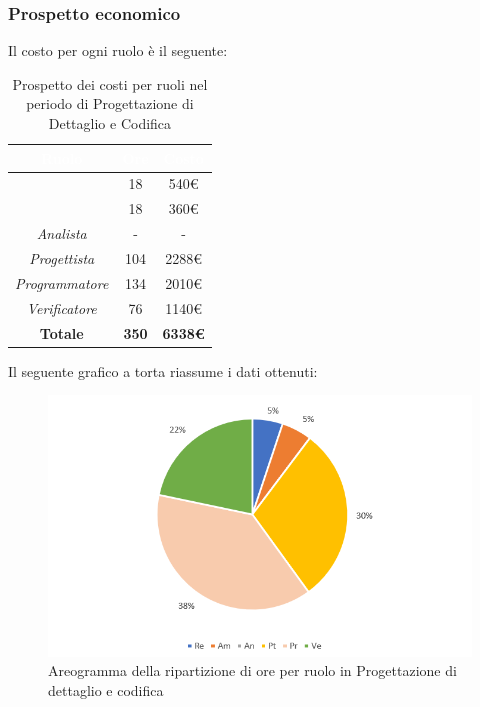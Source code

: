 \subsubsection{Prospetto economico}
Il costo per ogni ruolo è il seguente:
\begin{table}[H]
	\begin{center}
		\begin{tabular}{ |c c c| }
		\rowcolor{darkblue} 
		\textcolor{white}{\textbf{Ruolo}} & \textcolor{white}{\textbf{Ore}} & \textcolor{white}{\textbf{Costo}} \\ \hline
		\textit{\Responsabile} 		& 18 	& 540€ \\ \hline
		\textit{\Amministratore} 	& 18 	& 360€ \\ \hline
		\textit{Analista} 			& - 	& - \\ \hline
		\textit{Progettista} 		& 104 	& 2288€ \\ \hline
		\textit{Programmatore}  	& 134 	& 2010€ \\ \hline
		\textit{Verificatore} 		& 76 	& 1140€ \\ \hline
		\textbf{Totale} & \textbf{350} & \textbf{6338€} \\ \hline
		\end{tabular}
	\caption{ Prospetto dei costi per ruoli nel periodo di Progettazione di Dettaglio e Codifica}
	\end{center}
\end{table}
Il seguente grafico a torta riassume i dati ottenuti:
\begin{figure}[H]
    \centering
    \includegraphics[scale = 0.75]{Immagini/DettaglioTorta.png}
    \caption{Areogramma della ripartizione di ore per ruolo in Progettazione di dettaglio e codifica}
    \label{fig:Areogramma ripartizione ore, periodo di Progettazione di Dettaglio e Codifica}
\end{figure}
\newpage

